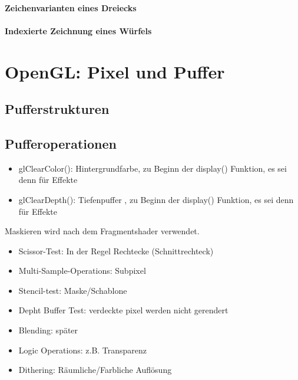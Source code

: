 \documentclass{scrreprt}
\begin{document}
\subsubsection*{Zeichenvarianten eines Dreiecks}
\subsubsection*{Indexierte Zeichnung eines Würfels}

\chapter{OpenGL: Pixel und Puffer}
\section{Pufferstrukturen}
\section{Pufferoperationen}
\begin{itemize}
\item glClearColor(): Hintergrundfarbe, zu Beginn der display() Funktion, es sei denn für Effekte
\item glClearDepth(): Tiefenpuffer , zu Beginn der display() Funktion, es sei denn für Effekte
\end{itemize}
Maskieren wird nach dem Fragmentshader verwendet.
\begin{itemize}
\item Scissor-Test: In der Regel Rechtecke (Schnittrechteck)
\item Multi-Sample-Operations: Subpixel
\item Stencil-test: Maske/Schablone
\item Depht Buffer Test: verdeckte pixel werden nicht gerendert
\item Blending: später
\item Logic Operations: z.B. Transparenz
\item Dithering: Räumliche/Farbliche Auflösung
\end{itemize}
\end{document}
